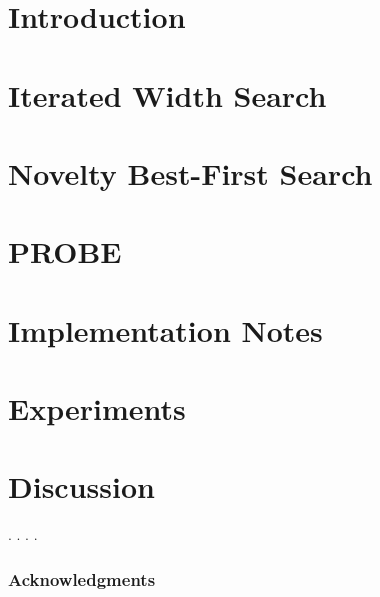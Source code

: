 \documentclass[letterpaper]{article}
\begin{document}
\section{Introduction}


\section{Iterated Width Search}


\section{Novelty Best-First Search}


\section{PROBE}


\section{Implementation Notes}



\section{Experiments}


\section{Discussion}

.
.
.
.

\subsubsection{Acknowledgments}




\end{document}
